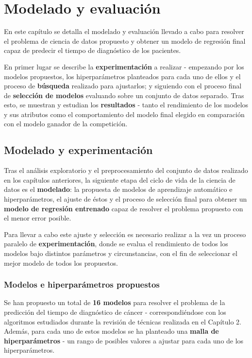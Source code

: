 \chapter{Modelado y evaluación}

En este capítulo se detalla el modelado y evaluación llevado a cabo para resolver el problema de ciencia de datos propuesto y obtener un modelo de regresión final capaz de predecir el tiempo de diagnóstico de los pacientes.

En primer lugar se describe la \textbf{experimentación} a realizar - empezando por los modelos propuestos, los hiperparámetros planteados para cada uno de ellos y el proceso de \textbf{búsqueda} realizado para ajustarlos; y siguiendo con el proceso final de \textbf{selección de modelos} evaluando sobre un conjunto de datos separado. Tras esto, se muestran y estudian los \textbf{resultados} - tanto el rendimiento de los modelos y sus atributos como el comportamiento del modelo final elegido en comparación con el modelo ganador de la competición.

\section{Modelado y experimentación}

Tras el análisis exploratorio y el preprocesamiento del conjunto de datos realizado en los capítulos anteriores, la siguiente etapa del ciclo de vida de la ciencia de datos es el \textbf{modelado}: la propuesta de modelos de aprendizaje automático e hiperparámetros, el ajuste de éstos y el proceso de selección final para obtener un \textbf{modelo de regresión entrenado} capaz de resolver el problema propuesto con el menor error posible.

Para llevar a cabo este ajuste y selección es necesario realizar a la vez un proceso paralelo de \textbf{experimentación}, donde se evalua el rendimiento de todos los modelos bajo distintos parámetros y circunstancias, con el fin de seleccionar el mejor modelo de todos los propuestos.

\subsection{Modelos e hiperparámetros propuestos}

Se han propuesto un total de \textbf{16 modelos} para resolver el problema de la predicción del tiempo de diagnóstico de cáncer - correspondiéndose con los algoritmos estudiados durante la revisión de técnicas realizada en el Capítulo 2. Además, para cada uno de estos modelos se ha planteado una \textbf{malla de hiperparámetros} - un rango de posibles valores a ajustar para cada uno de los hiperparámetros.

